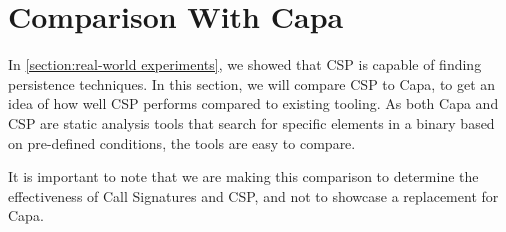 \section{Comparison With Capa}\label{section:capa comparison experiments}
In \autoref{section:real-world experiments}, we showed that CSP is capable of finding persistence techniques. In this section, we will compare CSP to Capa, to get an idea of how well CSP performs compared to existing tooling. As both Capa and CSP are static analysis tools that search for specific elements in a binary based on pre-defined conditions, the tools are easy to compare.

\medskip

It is important to note that we are making this comparison to determine the effectiveness of Call Signatures and CSP, and not to showcase a replacement for Capa.





